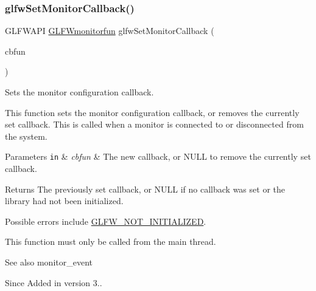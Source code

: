 \subsubsection{\texorpdfstring{glfw\+Set\+Monitor\+Callback()}{glfwSetMonitorCallback()}}
{\footnotesize\ttfamily G\+L\+F\+W\+A\+PI \hyperlink{group__monitor_ga8a7ee579a66720f24d656526f3e44c63}{G\+L\+F\+Wmonitorfun} glfw\+Set\+Monitor\+Callback (\begin{DoxyParamCaption}\item[{\hyperlink{group__monitor_ga8a7ee579a66720f24d656526f3e44c63}{G\+L\+F\+Wmonitorfun}}]{cbfun }\end{DoxyParamCaption})}



Sets the monitor configuration callback. 

This function sets the monitor configuration callback, or removes the currently set callback. This is called when a monitor is connected to or disconnected from the system.


\begin{DoxyParams}[1]{Parameters}
\mbox{\tt in}  & {\em cbfun} & The new callback, or {\ttfamily N\+U\+LL} to remove the currently set callback. \\
\hline
\end{DoxyParams}
\begin{DoxyReturn}{Returns}
The previously set callback, or {\ttfamily N\+U\+LL} if no callback was set or the library had not been initialized.
\end{DoxyReturn}
Possible errors include \hyperlink{group__errors_ga2374ee02c177f12e1fa76ff3ed15e14a}{G\+L\+F\+W\+\_\+\+N\+O\+T\+\_\+\+I\+N\+I\+T\+I\+A\+L\+I\+Z\+ED}.

This function must only be called from the main thread.

\begin{DoxySeeAlso}{See also}
monitor\+\_\+event
\end{DoxySeeAlso}
\begin{DoxySince}{Since}
Added in version 3.. 
\end{DoxySince}
